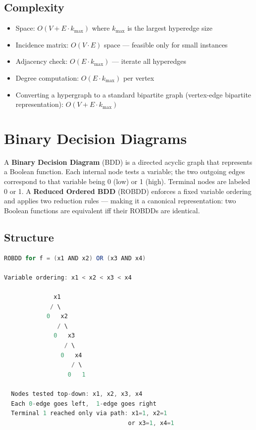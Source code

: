 \subsection{Complexity}

\begin{itemize}
\item Space: $O(V + E \cdot k_{\max})$ where $k_{\max}$ is the largest hyperedge size
\item Incidence matrix: $O(V \cdot E)$ space — feasible only for small instances
\item Adjacency check: $O(E \cdot k_{\max})$ — iterate all hyperedges
\item Degree computation: $O(E \cdot k_{\max})$ per vertex
\item Converting a hypergraph to a standard bipartite graph (vertex-edge bipartite representation): $O(V + E \cdot k_{\max})$
\end{itemize}

\section{Binary Decision Diagrams}

A \textbf{Binary Decision Diagram} (BDD) is a directed acyclic graph that represents a Boolean function. Each internal node tests a variable; the two outgoing edges correspond to that variable being 0 (low) or 1 (high). Terminal nodes are labeled 0 or 1. A \textbf{Reduced Ordered BDD} (ROBDD) enforces a fixed variable ordering and applies two reduction rules — making it a canonical representation: two Boolean functions are equivalent iff their ROBDDs are identical.

\subsection{Structure}

\begin{lstlisting}[language=Java]
ROBDD for f = (x1 AND x2) OR (x3 AND x4)

Variable ordering: x1 < x2 < x3 < x4

              x1
             / \
            0   x2
               / \
              0   x3
                 / \
                0   x4
                   / \
                  0   1

  Nodes tested top-down: x1, x2, x3, x4
  Each 0-edge goes left,  1-edge goes right
  Terminal 1 reached only via path: x1=1, x2=1
                                   or x3=1, x4=1
\end{lstlisting}

